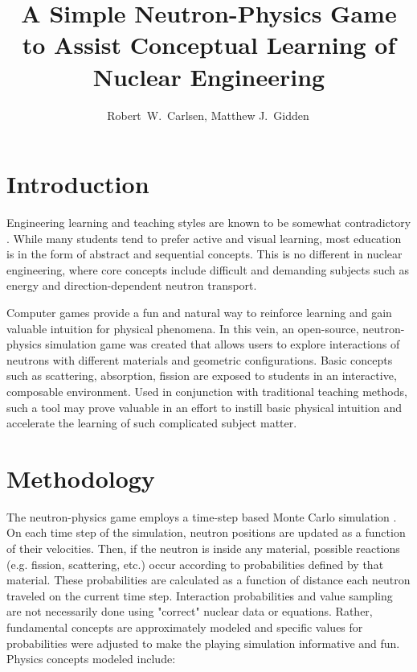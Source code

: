 \documentclass{anstrans}
\title{A Simple Neutron-Physics Game to Assist Conceptual Learning of Nuclear
  Engineering}
\author{Robert~W.~Carlsen, Matthew J.~Gidden$^{\*}$}
\institute{
University of Wisconsin, Nuclear Engineering Dept., 1500 Engineering Dr., Madison, WI
}
\begin{document}
\section{Introduction}

Engineering learning and teaching styles are known to be somewhat contradictory
\cite{felder2000learning}. While many students tend to prefer active and visual
learning, most education is in the form of abstract and sequential
concepts. This is no different in nuclear engineering, where core concepts
include difficult and demanding subjects such as energy and direction-dependent
neutron transport. 

Computer games provide a fun and natural way to reinforce learning and gain
valuable intuition for physical phenomena. In this vein, an open-source,
neutron-physics simulation game was created \cite{Carlsen2015} that allows users
to explore interactions of neutrons with different materials and geometric
configurations. Basic concepts such as scattering, absorption, fission are
exposed to students in an interactive, composable environment. Used in
conjunction with traditional teaching methods, such a tool may prove valuable in
an effort to instill basic physical intuition and accelerate the learning of
such complicated subject matter.

\section{Methodology}

The neutron-physics game employs a time-step based Monte Carlo
simulation \cite{lewis1984computational}. On each time step of the simulation,
neutron positions are updated as a function of their velocities.  Then, if the
neutron is inside any material, possible reactions (e.g. fission, scattering,
etc.)  occur according to probabilities defined by that material.  These
probabilities are calculated as a function of distance each neutron traveled on
the current time step.  Interaction probabilities and value sampling are not
necessarily done using "correct" nuclear data or equations.  Rather, fundamental
concepts are approximately modeled and specific values for probabilities were
adjusted to make the playing simulation informative and fun.  Physics concepts
modeled include:
\end{document}
